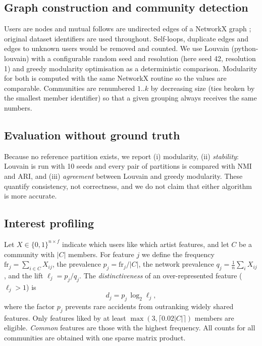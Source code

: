 \documentclass[conference]{IEEEtran}
\begin{document}
\subsection{Graph construction and community detection}
Users are nodes and mutual follows are undirected edges of a NetworkX graph \cite{hagberg2008}; original dataset identifiers are used throughout. Self-loops, duplicate edges and edges to unknown users would be removed and counted. We use Louvain \cite{blondel2008} (python-louvain) with a configurable random seed and resolution (here seed 42, resolution 1) and greedy modularity optimisation \cite{clauset2004} as a deterministic comparison. Modularity for both is computed with the same NetworkX routine so the values are comparable. Communities are renumbered $1..k$ by decreasing size (ties broken by the smallest member identifier) so that a given grouping always receives the same numbers.

\subsection{Evaluation without ground truth}
Because no reference partition exists, we report (i) modularity, (ii) \emph{stability}: Louvain is run with 10 seeds and every pair of partitions is compared with NMI and ARI, and (iii) \emph{agreement} between Louvain and greedy modularity. These quantify consistency, not correctness, and we do not claim that either algorithm is more accurate.

\subsection{Interest profiling}
Let $X\in\{0,1\}^{n\times f}$ indicate which users like which artist features, and let $C$ be a community with $|C|$ members. For feature $j$ we define the frequency $\mathrm{fr}_j=\sum_{i\in C}X_{ij}$, the prevalence $p_j=\mathrm{fr}_j/|C|$, the network prevalence $q_j=\frac{1}{n}\sum_i X_{ij}$, and the lift $\ell_j=p_j/q_j$. The \emph{distinctiveness} of an over-represented feature ($\ell_j>1$) is
\begin{equation}
d_j = p_j\,\log_2 \ell_j ,
\end{equation}
where the factor $p_j$ prevents rare accidents from outranking widely shared features. Only features liked by at least $\max(3,\lceil 0.02|C|\rceil)$ members are eligible. \emph{Common} features are those with the highest frequency. All counts for all communities are obtained with one sparse matrix product.
\end{document}
